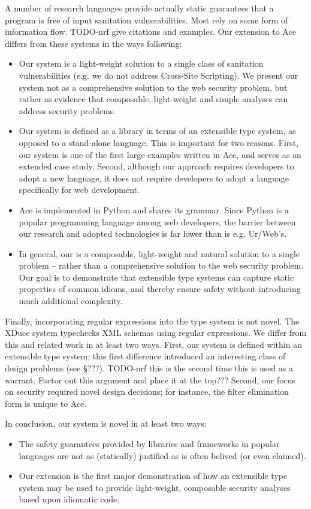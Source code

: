 \documentclass[10pt,preprint]{sigplanconf}
\theoremstyle{definition}
\begin{document}
A number of research languages provide actually static guarantees that a program
is free of input sanitation vulnerabilities. Most rely on some form of information
flow. TODO-nrf  give citations and examples. Our extension to Ace differs from
these systems in the ways following:
\begin{itemize}
  \item Our system is a light-weight solution to a single class of sanitation
  vulnerabilities (e.g. we do not address Cross-Site Scripting). We present our
  system not as a comprehensive solution to the web security problem, but rather as
  evidence that composable, light-weight and simple analyses can address security
  problems.
  \item Our system is defined as a library in terms of an extensible type system,
  as opposed to a stand-alone language. This is important for two reasons.
  First, our system is one of the first large examples written in Ace, and serves
  as an extended case study. Second, although our approach requires
  developers to adopt a new language, it does not require developers to adopt
  a language specifically for web development.
  \item Ace is implemented in Python and shares its grammar. Since Python is a 
  popular programming language among web developers, the barrier between our research
  and adopted technologies is far lower than is e.g. Ur/Web's.
  \item In general, our is a composable, light-weight and
  natural solution to a single problem -- rather than a comprehensive 
  solution to the web security problem. Our goal is to demonstrate that extensible
  type systems can capture static properties of common idioms, and thereby ensure
  safety without introducing much additional complexity.
\end{itemize}

Finally, incorporating regular expressions into the type system is not novel.
The XDuce system \cite{pierce} typechecks XML schemas using regular expressions.
We differ from this and related work in at least two ways.
First, our system  is defined within an extensible type system;
this first difference introduced an interesting class of design problems (see \S ???).
TODO-nrf this is the second time this is used as a warrant. Factor out this argument
and place it at the top???
Second, our focus on security required novel design decisions; for instance, the
filter elimination form is unique to Ace.

In conclusion, our system is novel in at least two ways:
\begin{itemize}
\item The safety guarantees provided by libraries and frameworks in popular languages
are not as (statically) justified as is often belived (or even claimed).
\item Our extension is the first major demonstration of how an extensible type
system may be used to provide light-weight, composable security analyses based upon
idiomatic code.
\end{itemize}
\end{document}
